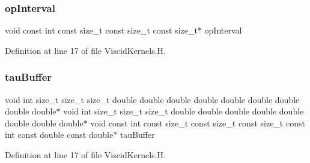 \subsubsection{\texorpdfstring{op\+Interval}{opInterval}}
{\footnotesize\ttfamily void const int const size\+\_\+t const size\+\_\+t const size\+\_\+t$\ast$ op\+Interval}



Definition at line 17 of file Viscid\+Kernels.\+H.

\hypertarget{ViscidKernels_8H_a4fefa736ee83a524669dc93b83a218df}{}\label{ViscidKernels_8H_a4fefa736ee83a524669dc93b83a218df} 
\subsubsection{\texorpdfstring{tau\+Buffer}{tauBuffer}}
{\footnotesize\ttfamily void int size\+\_\+t size\+\_\+t size\+\_\+t double double double double double double double double double$\ast$ void int size\+\_\+t size\+\_\+t size\+\_\+t double double double double double double double double$\ast$ void const int const size\+\_\+t const size\+\_\+t const size\+\_\+t const int const double const double$\ast$ tau\+Buffer}



Definition at line 17 of file Viscid\+Kernels.\+H.

